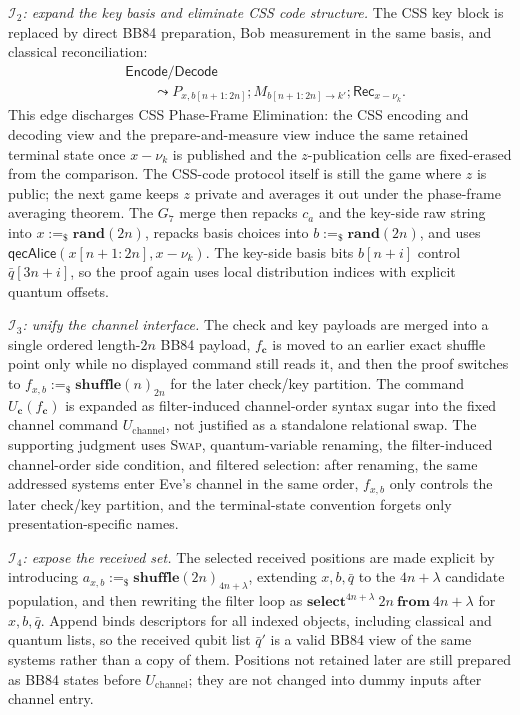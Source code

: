 \documentclass[conference,compsoc]{IEEEtran}
\newcommand{\bb}{\textsf{BB84}\xspace}
\begin{document}
\emph{\(\mathcal I_2\): expand the key basis and eliminate CSS code structure.}
The CSS key block is replaced by direct \bb preparation, Bob measurement in the same basis, and classical reconciliation:
\[
\begin{aligned}
&\mathsf{Encode}/\mathsf{Decode}\\
&\qquad\leadsto
P_{x,b[n+1{:}2n]};
M_{b[n+1{:}2n]\to k'};
\mathsf{Rec}_{x-\nu_k}.
\end{aligned}
\]
This edge discharges CSS Phase-Frame Elimination: the CSS encoding and decoding view and the prepare-and-measure view induce the same retained terminal state once \(x-\nu_k\) is published and the \(z\)-publication cells are fixed-erased from the comparison. The CSS-code protocol itself is still the game where \(z\) is public; the next game keeps \(z\) private and averages it out under the phase-frame averaging theorem. The \(G_{7}\) merge then repacks \(c_a\) and the key-side raw string into \(x:=_\$\mathbf{rand}(2n)\), repacks basis choices into \(b:=_\$\mathbf{rand}(2n)\), and uses \(\mathsf{qecAlice}(x[n+1{:}2n],x-\nu_k)\). The key-side basis bits \(b[n+i]\) control \(\bar q[3n+i]\), so the proof again uses local distribution indices with explicit quantum offsets.

\emph{\(\mathcal I_3\): unify the channel interface.}
The check and key payloads are merged into a single ordered length-\(2n\) \bb payload, \(f_{\mathbf c}\) is moved to an earlier exact shuffle point only while no displayed command still reads it, and then the proof switches to \(f_{x,b}:=_\$\mathbf{shuffle}(n)_{2n}\) for the later check/key partition. The command \(U_{\mathbf c}(f_{\mathbf c})\) is expanded as filter-induced channel-order syntax sugar into the fixed channel command \(U_{\mathrm{channel}}\), not justified as a standalone relational swap. The supporting judgment uses \textsc{Swap}, quantum-variable renaming, the filter-induced channel-order side condition, and filtered selection: after renaming, the same addressed systems enter Eve's channel in the same order, \(f_{x,b}\) only controls the later check/key partition, and the terminal-state convention forgets only presentation-specific names.

\emph{\(\mathcal I_4\): expose the received set.}
The selected received positions are made explicit by introducing \(a_{x,b}:=_\$\mathbf{shuffle}(2n)_{4n+\lambda}\), extending \(x,b,\bar q\) to the \(4n+\lambda\) candidate population, and then rewriting the filter loop as \(\mathbf{select}^{4n+\lambda}\ 2n\ \mathbf{from}\ 4n+\lambda\) for \(x,b,\bar q\). Append binds descriptors for all indexed objects, including classical and quantum lists, so the received qubit list \(\bar q'\) is a valid \bb view of the same systems rather than a copy of them. Positions not retained later are still prepared as \bb states before \(U_{\mathrm{channel}}\); they are not changed into dummy inputs after channel entry.
\end{document}
